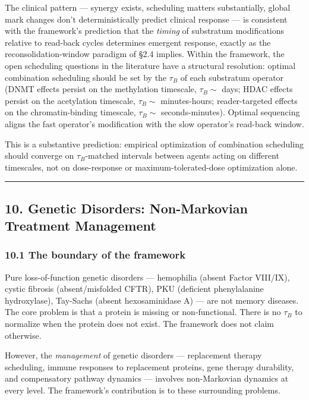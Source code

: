 \documentclass[
]{article}
\begin{document}
The clinical pattern --- synergy exists, scheduling matters
substantially, global mark changes don't deterministically predict
clinical response --- is consistent with the framework's prediction that
the \emph{timing} of substratum modifications relative to read-back
cycles determines emergent response, exactly as the
reconsolidation-window paradigm of §2.4 implies. Within the framework,
the open scheduling questions in the literature have a structural
resolution: optimal combination scheduling should be set by the
\(\tau_B\) of each substratum operator (DNMT effects persist on the
methylation timescale, \(\tau_B \sim\) days; HDAC effects persist on the
acetylation timescale, \(\tau_B \sim\) minutes-hours; reader-targeted
effects on the chromatin-binding timescale, \(\tau_B \sim\)
seconds-minutes). Optimal sequencing aligns the fast operator's
modification with the slow operator's read-back window.

This is a substantive prediction: empirical optimization of combination
scheduling should converge on \(\tau_B\)-matched intervals between
agents acting on different timescales, not on dose-response or
maximum-tolerated-dose optimization alone.

\begin{center}\rule{0.5\linewidth}{0.5pt}\end{center}

\hypertarget{genetic-disorders-non-markovian-treatment-management}{%
\subsection{10. Genetic Disorders: Non-Markovian Treatment
Management}\label{genetic-disorders-non-markovian-treatment-management}}

\hypertarget{the-boundary-of-the-framework}{%
\subsubsection{10.1 The boundary of the
framework}\label{the-boundary-of-the-framework}}

Pure loss-of-function genetic disorders --- hemophilia (absent Factor
VIII/IX), cystic fibrosis (absent/misfolded CFTR), PKU (deficient
phenylalanine hydroxylase), Tay-Sachs (absent hexosaminidase A) --- are
not memory diseases. The core problem is that a protein is missing or
non-functional. There is no \(\tau_B\) to normalize when the protein
does not exist. The framework does not claim otherwise.

However, the \emph{management} of genetic disorders --- replacement
therapy scheduling, immune responses to replacement proteins, gene
therapy durability, and compensatory pathway dynamics --- involves
non-Markovian dynamics at every level. The framework's contribution is
to these surrounding problems.
\end{document}

